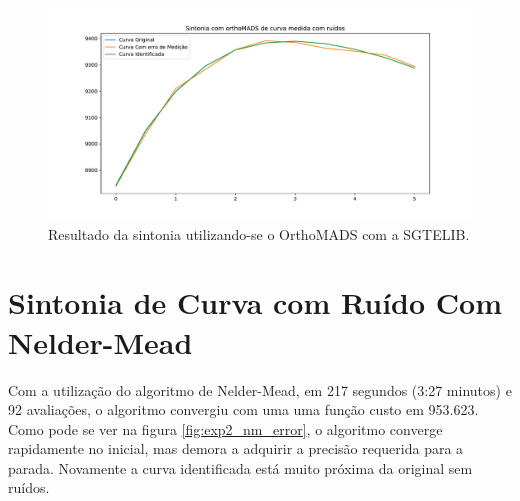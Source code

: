 \begin{figure}[H]
\centering
  \includegraphics[width=1\linewidth]{figs/curva_sg.pdf}
  \caption{Resultado da sintonia utilizando-se o OrthoMADS com a SGTELIB.}
  \label{fig:exp2_sg_curve}
\end{figure}


\section{Sintonia de Curva com Ruído Com Nelder-Mead}

Com a utilização do algoritmo de Nelder-Mead, em 217 segundos (3:27 minutos) e 92 avaliações, o algoritmo convergiu com uma uma função custo em 953.623. Como pode se ver na figura \ref{fig:exp2_nm_error}, o algoritmo converge rapidamente no inicial, mas demora a adquirir a precisão requerida para a parada. Novamente a curva identificada está muito próxima da original sem ruídos.



